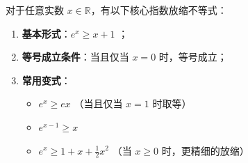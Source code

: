 \begin{statementbox}
对于任意实数 $x \in \mathbb{R}$，有以下核心指数放缩不等式：
\begin{enumerate}
    \item \textbf{基本形式}：$e^x \geqslant x + 1$ ；
    \item \textbf{等号成立条件}：当且仅当 $x = 0$ 时，等号成立；
    \item \textbf{常用变式}：
    \begin{itemize}
        \item $e^x \geqslant ex$ （当且仅当 $x=1$ 时取等）
        \item $e^{x-1} \geqslant x$
        \item $e^x \geqslant 1 + x + \frac{1}{2}x^2$ （当 $x \geqslant 0$ 时，更精细的放缩）
    \end{itemize}
\end{enumerate}
\end{statementbox}
